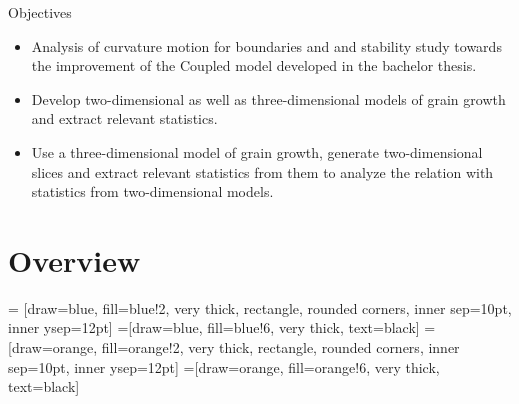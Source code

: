 \documentclass[usenames,dvipsnames]{beamer}
\begin{document}
\begin{frame}{Objectives}
\begin{itemize}
    \item Analysis of curvature motion for boundaries and and stability study towards the improvement of the Coupled model developed in the bachelor thesis.
    \item Develop two-dimensional as well as three-dimensional models of grain growth and extract relevant statistics.
    \item Use a three-dimensional model of grain growth, generate two-dimensional slices and extract relevant statistics from them to analyze the relation with statistics from two-dimensional models.
\end{itemize}
\end{frame}


\section{Overview}

 = [draw=blue, fill=blue!2, very thick, rectangle, rounded corners, inner sep=10pt, inner ysep=12pt]
 =[draw=blue, fill=blue!6, very thick, text=black]
 = [draw=orange, fill=orange!2, very thick, rectangle, rounded corners, inner sep=10pt, inner ysep=12pt]
 =[draw=orange, fill=orange!6, very thick, text=black]
\end{document}
